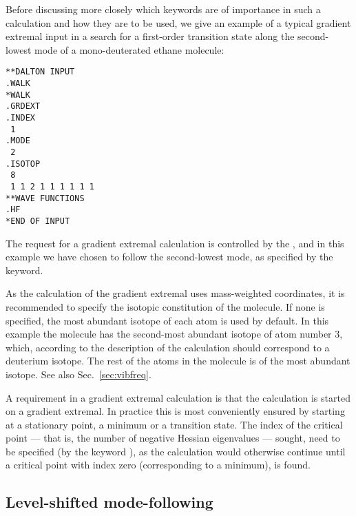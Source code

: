 Before discussing more closely which keywords are of importance in
such a calculation and how they are to be used, we give an example of
a typical gradient extremal input in a search for a first-order
transition state along the second-lowest mode of a mono-deuterated
ethane molecule:

\begin{verbatim}
**DALTON INPUT
.WALK
*WALK
.GRDEXT
.INDEX
 1
.MODE
 2
.ISOTOP
 8
 1 1 2 1 1 1 1 1 1
**WAVE FUNCTIONS
.HF
*END OF INPUT
\end{verbatim}


The request for a gradient extremal
calculation is controlled by the {}, and in this example
we have chosen to follow the second-lowest mode, as specified by the
 keyword.

As the calculation of the gradient extremal uses mass-weighted
coordinates, it is recommended to
specify the isotopic constitution of
the molecule. If none is specified, the most abundant
isotope of each atom is used by default. In this example the
molecule has the second-most abundant isotope of atom number 3, which,
according to the description of the calculation should correspond
to a deuterium isotope. The rest of the atoms in the molecule is of
the most abundant isotope. See also Sec.~\ref{sec:vibfreq}.

A requirement in a gradient extremal calculation is that the
calculation is started on a gradient extremal. In practice this is
most conveniently ensured by starting at a stationary point, a minimum
or a transition state. The index of the critical point
--- that is,
the number of negative Hessian eigenvalues
--- sought, need to
be specified (by the keyword ), as the calculation would
otherwise continue until a critical point with index zero
(corresponding to a minimum), is found.

\subsection{Level-shifted mode-following}\label{sec:modfol}

\begin{center}
\end{center}

